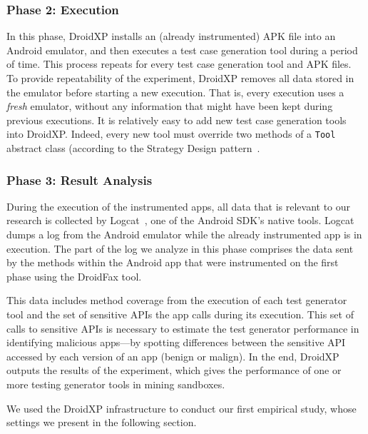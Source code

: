 \subsubsection{Phase 2: Execution}

In this phase, DroidXP installs an (already instrumented) APK file into
an Android emulator, and then executes a test case generation tool
during a period of time. This process repeats for every test case generation
tool and APK files. To provide repeatability of the experiment, DroidXP
removes all data stored in the emulator before starting
a new execution. That is, every execution uses a \emph{fresh} emulator,
without any information that might have been kept during
previous executions. 
It is relatively easy to add new test
case generation tools into DroidXP. Indeed,
every new tool must override two methods
of a \texttt{Tool} abstract class (according to
the Strategy Design pattern~\cite{patterns-book}.

\subsubsection{Phase 3: Result Analysis}

During the execution of the instrumented apps, all data that is relevant to our
research is collected by Logcat~\cite{Logcat}, one of the Android SDK's native tools. Logcat dumps a log from the Android emulator
while the already instrumented app is in execution. The part of the log we analyze in this phase comprises
the data sent by the methods within the Android app that were instrumented on the first
phase using the DroidFax tool. 

This data includes method coverage from the execution of each test generator tool and the
set of sensitive APIs the app calls during its execution. This set of calls to
sensitive APIs is necessary to estimate the test generator performance in identifying malicious apps---by spotting
differences between the sensitive API accessed by each version of an app (benign or malign).
In the end, DroidXP outputs the results of the experiment, which gives the
performance of one or more testing generator tools in mining sandboxes.

We used the DroidXP infrastructure to conduct our
first empirical study, whose settings we present in the following section. 

